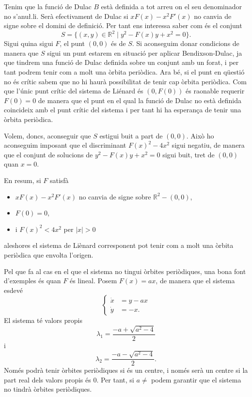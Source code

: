 \documentclass[12pt]{article}
\numberwithin{table}{section}
\numberwithin{equation}{section}
\numberwithin{figure}{section}
\newcommand{\R}{\mathbb{R}}
\newcommand{\abs}[1]{\lvert #1 \rvert}
\begin{document}
Tenim que la funció de Dulac \( B \) està definida a tot arreu on el seu denominador no s'anu\l.li. Serà efectivament de Dulac si \( xF(x) - x^2F'(x) \) no canvia de signe sobre el domini de definició. Per tant ens interessa saber com és el conjunt
\begin{equation*}
    S = \{(x,y) \in \R^2 \mid y^2 - F(x)y + x^2 = 0 \}.
\end{equation*}
Sigui quina sigui \( F \), el punt \( (0,0) \) és de \( S \). Si aconseguim donar condicions de manera que \( S \) sigui un punt estarem en situació per aplicar Bendixson-Dulac, ja que tindrem una funció de Dulac definida sobre un conjunt amb un forat, i per tant podrem tenir com a molt una òrbita periòdica. Ara bé, si el punt en qüestió no és crític sabem que no hi haurà possibilitat de tenir cap òrbita periòdica. Com que l'únic punt crític del sistema de Liénard és \( (0, F(0)) \) és raonable requerir \( F(0) = 0 \) de manera que el punt en el qual la funció de Dulac no està definida coincideix amb el punt crític del sistema i per tant hi ha esperança de tenir una òrbita periòdica. 

Volem, doncs, aconseguir que \( S \) estigui buit a part de \( (0,0) \). Això ho aconseguim imposant que el discriminant \( F(x)^2 - 4x^2 \) sigui negatiu, de manera que el conjunt de solucions de \( y^2 - F(x)y + x^2 = 0 \) sigui buit, tret de \( (0,0) \) quan \( x = 0 \). 

En resum, si \( F \) satisfà
\begin{itemize}
    \item \( xF(x) - x^2F'(x) \) no canvia de signe sobre \( \R^2 - {(0,0)} \),
    \item \( F(0) = 0 \),
    \item i \( F(x)^2 < 4x^2 \) per \( \abs{x} > 0 \)
\end{itemize}
aleshores el sistema de Liènard corresponent pot tenir com a molt una òrbita periòdica que envolta l'origen.

Pel que fa al cas en el que el sistema no tingui òrbites periòdiques, una bona font d'exemples és quan \( F \) és lineal. Posem \( F(x) = ax \), de manera que el sistema esdevé
\begin{equation*}
    \left\{
		\begin{aligned}
			\dot{x} &= y - ax \\
			\dot{y} &= -x.
		\end{aligned}
	\right.
\end{equation*}
El sistema té valors propis
\begin{equation*}
    \lambda_1 = \frac{-a + \sqrt{a^2 - 4}}{2}
\end{equation*}
i 
\begin{equation*}
    \lambda_2 = \frac{-a - \sqrt{a^2 - 4}}{2}.
\end{equation*}
Només podrà tenir òrbites periòdiques si és un centre, i només serà un centre si la part real dels valors propis és 0. Per tant, si \( a \neq \) podem garantir que el sistema no tindrà òrbites periòdiques.
\end{document}
